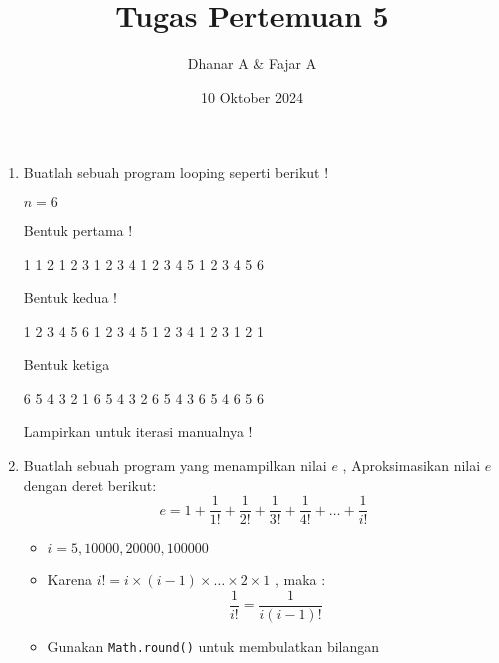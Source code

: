 \documentclass{article}
\title{\textbf{Tugas Pertemuan 5}}
\date{10 Oktober 2024}
\author{Dhanar A \& Fajar A}
\begin{document}
\maketitle

\begin{enumerate}
    \item Buatlah sebuah program looping seperti berikut !

    \begin{req}
        $n = 6$
    \end{req}

    \begin{RunCode}
Bentuk pertama !

1
1 2
1 2 3
1 2 3 4
1 2 3 4 5
1 2 3 4 5 6
    \end{RunCode}

    \begin{RunCode}
Bentuk kedua !

1 2 3 4 5 6
1 2 3 4 5
1 2 3 4
1 2 3
1 2
1
    \end{RunCode}

    \begin{RunCode}
Bentuk ketiga

6 5 4 3 2 1
6 5 4 3 2
6 5 4 3
6 5 4
6 5
6
    \end{RunCode}

    \begin{out}
        Lampirkan untuk iterasi manualnya !
    \end{out}
    \newpage

    \item Buatlah sebuah program yang menampilkan nilai $e$ , Aproksimasikan nilai $e$ dengan deret berikut:
    $$e = 1 + \dfrac{1}{1!} + \dfrac{1}{2!} + \dfrac{1}{3!} + \dfrac{1}{4!} + \ldots + \dfrac{1}{i!}$$

    \begin{req}
    \begin{itemize}
        \item  $i = 5, 10000 , 20000 , 100000$
    \end{itemize} 
    \end{req}

    \begin{hint}
    \begin{itemize}
        \item Karena $i! = i \times (i-1) \times \ldots \times 2 \times 1 $ , maka :
        $$\dfrac{1}{i!} = \dfrac{1}{i(i-1)!}$$
        \item Gunakan \texttt{Math.round()} untuk membulatkan bilangan
    \end{itemize}
        

\end{hint}
\end{enumerate}
\end{document}
